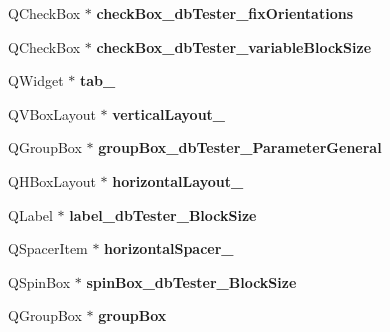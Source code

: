 \begin{DoxyCompactItemize}
\item 
\mbox{\label{class_ui___main_window_a8668945afd78b13346b3b0a55046a1c5}} 
Q\+Check\+Box $\ast$ {\bfseries check\+Box\+\_\+db\+Tester\+\_\+fix\+Orientations}
\item 
\mbox{\label{class_ui___main_window_a574c2a81e326ade6e652a04af3f5b537}} 
Q\+Check\+Box $\ast$ {\bfseries check\+Box\+\_\+db\+Tester\+\_\+variable\+Block\+Size}
\item 
\mbox{\label{class_ui___main_window_aa9899d9e0d47ad34988a47a9d58c9d4c}} 
Q\+Widget $\ast$ {\bfseries tab\+\_}
\item 
\mbox{\label{class_ui___main_window_a610d74595e4e06bac04abb42b9849293}} 
Q\+V\+Box\+Layout $\ast$ {\bfseries vertical\+Layout\+\_}
\item 
\mbox{\label{class_ui___main_window_a150f761e43ebade42654144a767dce5a}} 
Q\+Group\+Box $\ast$ {\bfseries group\+Box\+\_\+db\+Tester\+\_\+\+Parameter\+General}
\item 
\mbox{\label{class_ui___main_window_afb4ab27a4cd626c64c34ab3651fa8413}} 
Q\+H\+Box\+Layout $\ast$ {\bfseries horizontal\+Layout\+\_}
\item 
\mbox{\label{class_ui___main_window_a51cdea9df0d717fbc4a58f865586a41a}} 
Q\+Label $\ast$ {\bfseries label\+\_\+db\+Tester\+\_\+\+Block\+Size}
\item 
\mbox{\label{class_ui___main_window_af2b7290d54affa41367b1006fba794f6}} 
Q\+Spacer\+Item $\ast$ {\bfseries horizontal\+Spacer\+\_}
\item 
\mbox{\label{class_ui___main_window_a0cd4337a2ff675c6b778f066c55cf73b}} 
Q\+Spin\+Box $\ast$ {\bfseries spin\+Box\+\_\+db\+Tester\+\_\+\+Block\+Size}
\item 
\mbox{\label{class_ui___main_window_aef7cb3be8cecfc9aaf98f036a98781ce}} 
Q\+Group\+Box $\ast$ {\bfseries group\+Box}
\item 

\end{DoxyCompactItemize}
